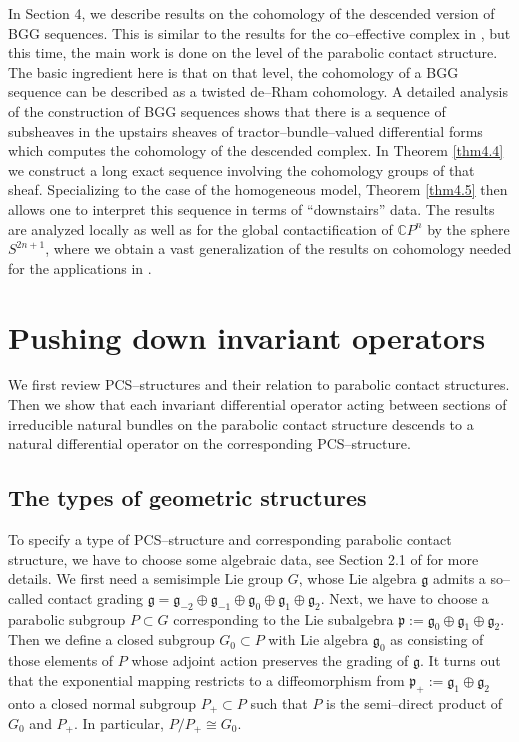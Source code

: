 \documentclass[12pt,a4paper]{amsart}
\def\frak{\mathfrak}
\def\Bbb{\mathbb}
\numberwithin{theorem}{section}
\theoremstyle{definition}
\theoremstyle{remark}
\begin{document}
In Section 4, we describe results on the cohomology of the descended
version of BGG sequences. This is similar to the results for the
co--effective complex in \cite{Cap-Salac}, but this time, the main
work is done on the level of the parabolic contact structure. The
basic ingredient here is that on that level, the cohomology of a BGG
sequence can be described as a twisted de--Rham cohomology. A detailed
analysis of the construction of BGG sequences shows that there is a
sequence of subsheaves in the upstairs sheaves of
tractor--bundle--valued differential forms which computes the
cohomology of the descended complex. In Theorem \ref{thm4.4} we construct
a long exact sequence involving the cohomology groups of that
sheaf. Specializing to the case of the homogeneous model, Theorem
\ref{thm4.5} then allows one to interpret this sequence in terms of
``downstairs'' data. The results are analyzed locally as well as for
the global contactification of $\Bbb CP^n$ by the sphere $S^{2n+1}$,
where we obtain a vast generalization of the results on cohomology
needed for the applications in \cite{E-G}.

\section{Pushing down invariant operators}\label{2}
We first review PCS--structures and their relation to parabolic
contact structures. Then we show that each invariant differential
operator acting between sections of irreducible natural bundles on the
parabolic contact structure descends to a natural differential
operator on the corresponding PCS--structure.

\subsection{The types of geometric structures}\label{2.1}
To specify a type of PCS--structure and corresponding parabolic
contact structure, we have to choose some algebraic data, see Section
2.1 of \cite{PCS2} for more details. We first need a semisimple
Lie group $G$, whose Lie algebra $\frak g$ admits a so--called contact
grading $\frak g=\frak g_{-2}\oplus\frak g_{-1}\oplus\frak
g_0\oplus\frak g_1\oplus\frak g_2$. Next, we have to choose a
parabolic subgroup $P\subset G$ corresponding to the Lie subalgebra
$\frak p:=\frak g_0\oplus\frak g_1\oplus\frak g_2$. Then we define a
closed subgroup $G_0\subset P$ with Lie algebra $\frak g_0$ as
consisting of those elements of $P$ whose adjoint action preserves the
grading of $\frak g$. It turns out that the exponential mapping
restricts to a diffeomorphism from $\frak p_+:=\frak g_1\oplus\frak
g_2$ onto a closed normal subgroup $P_+\subset P$ such that $P$ is the
semi--direct product of $G_0$ and $P_+$. In particular, $P/P_+\cong
G_0$. 
\end{document}
